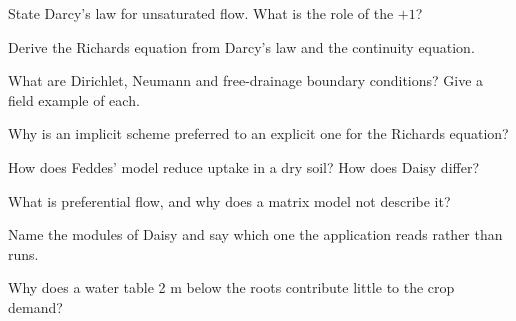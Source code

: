 \begin{exlist}
\item State Darcy's law for unsaturated flow. What is the role of the $+1$?
\item Derive the Richards equation from Darcy's law and the continuity equation.
\item What are Dirichlet, Neumann and free-drainage boundary conditions? Give a field example of each.
\item Why is an implicit scheme preferred to an explicit one for the Richards equation?
\item How does Feddes' model reduce uptake in a dry soil? How does Daisy differ?
\item What is preferential flow, and why does a matrix model not describe it?
\item Name the modules of Daisy and say which one the application reads rather than runs.
\item Why does a water table 2 m below the roots contribute little to the crop demand?
\end{exlist}
